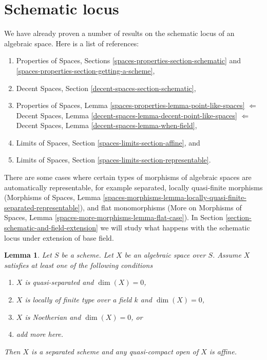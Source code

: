 \documentclass{stacks-project}
\theoremstyle{plain}
\newtheorem{lemma}[subsection]{Lemma}
\theoremstyle{definition}
\theoremstyle{remark}
\numberwithin{equation}{subsection}
\begin{document}
\section{Schematic locus}
\label{section-schematic}

\noindent
We have already proven a number of results on the schematic locus
of an algebraic space. Here is a list of references:
\begin{enumerate}
\item Properties of Spaces, Sections
\ref{spaces-properties-section-schematic} and
\ref{spaces-properties-section-getting-a-scheme},
\item Decent Spaces, Section \ref{decent-spaces-section-schematic},
\item Properties of Spaces, Lemma
\ref{spaces-properties-lemma-point-like-spaces}
$\Leftarrow$
Decent Spaces, Lemma \ref{decent-spaces-lemma-decent-point-like-spaces}
$\Leftarrow$
Decent Spaces, Lemma \ref{decent-spaces-lemma-when-field},
\item Limits of Spaces, Section \ref{spaces-limits-section-affine}, and
\item Limits of Spaces, Section \ref{spaces-limits-section-representable}.
\end{enumerate}
There are some cases where certain types of morphisms of algebraic spaces
are automatically representable, for example
separated, locally quasi-finite morphisms (Morphisms of Spaces, Lemma
\ref{spaces-morphisms-lemma-locally-quasi-finite-separated-representable}),
and flat monomorphisms (More on Morphisms of Spaces, Lemma
\ref{spaces-more-morphisms-lemma-flat-case}).
In Section \ref{section-schematic-and-field-extension}
we will study what happens with the schematic
locus under extension of base field.

\begin{lemma}
\label{lemma-locally-finite-type-dim-zero}
Let $S$ be a scheme. Let $X$ be an algebraic space over $S$.
Assume $X$ satisfies at least one of the following conditions
\begin{enumerate}
\item $X$ is quasi-separated and $\dim(X) = 0$,
\item $X$ is locally of finite type over a field $k$ and $\dim(X) = 0$,
\item $X$ is Noetherian and $\dim(X) = 0$, or
\item add more here.
\end{enumerate}
Then $X$ is a separated scheme and any quasi-compact open of $X$ is affine.
\end{lemma}
\end{document}
